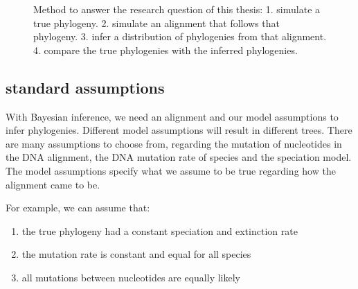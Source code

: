 {\begin{figure}[H]
{
  }
  \caption{
    Method to answer the research question of this thesis:
    1. simulate a true phylogeny. 
    2. simulate an alignment that follows that phylogeny. 
    3. infer a distribution of phylogenies from that alignment.
    4. compare the true phylogenies with the inferred phylogenies.
  }
  \label{fig:research_workflow}
\end{figure}

\subsection{standard assumptions}

With Bayesian inference, we need an alignment and our model assumptions to
infer phylogenies.
Different model assumptions will result in different trees.
There are many assumptions to choose from, regarding
the mutation of nucleotides in the DNA alignment, the
DNA mutation rate of species and the speciation model.
The model assumptions specify what we assume to be true regarding how
the alignment came to be. 

For example, we can assume that:

\begin{enumerate}[label=\arabic*)]\itemsep2pt
  \item the true phylogeny had a constant speciation and extinction rate 
  \item the mutation rate is constant and equal for all species
  \item all mutations between nucleotides are equally likely
\end{enumerate}

}

